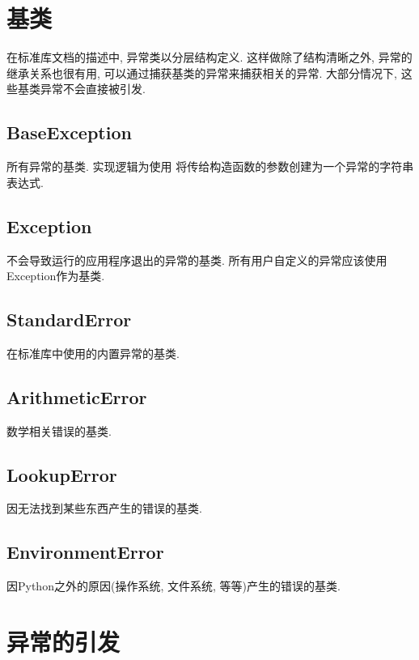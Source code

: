 \documentclass[a4paper,10pt,english]{manual}
\begin{document}
\section{基类}

在标准库文档的描述中, 异常类以分层结构定义. 这样做除了结构清晰之外, 异常的继承关系也很有用, 可以通过捕获基类的异常来捕获相关的异常. 大部分情况下, 这些基类异常不会直接被引发.


\subsection{BaseException}

所有异常的基类. 实现逻辑为使用  将传给构造函数的参数创建为一个异常的字符串表达式.


\subsection{Exception}

不会导致运行的应用程序退出的异常的基类.
所有用户自定义的异常应该使用Exception作为基类.


\subsection{StandardError}

在标准库中使用的内置异常的基类.


\subsection{ArithmeticError}

数学相关错误的基类.


\subsection{LookupError}

因无法找到某些东西产生的错误的基类.


\subsection{EnvironmentError}

因Python之外的原因(操作系统, 文件系统, 等等)产生的错误的基类.


\section{异常的引发}
\end{document}
